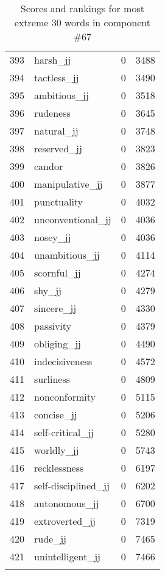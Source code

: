 \begin{longtable}[!htbp]{| rlr@{.}l |}
    393 & harsh\_jj & 0 & 3488 \\
    394 & tactless\_jj & 0 & 3490 \\
    395 & ambitious\_jj & 0 & 3518 \\
    396 & rudeness & 0 & 3645 \\
    397 & natural\_jj & 0 & 3748 \\
    398 & reserved\_jj & 0 & 3823 \\
    399 & candor & 0 & 3826 \\
    400 & manipulative\_jj & 0 & 3877 \\
    401 & punctuality & 0 & 4032 \\
    402 & unconventional\_jj & 0 & 4036 \\
    403 & nosey\_jj & 0 & 4036 \\
    404 & unambitious\_jj & 0 & 4114 \\
    405 & scornful\_jj & 0 & 4274 \\
    406 & shy\_jj & 0 & 4279 \\
    407 & sincere\_jj & 0 & 4330 \\
    408 & passivity & 0 & 4379 \\
    409 & obliging\_jj & 0 & 4490 \\
    410 & indecisiveness & 0 & 4572 \\
    411 & surliness & 0 & 4809 \\
    412 & nonconformity & 0 & 5115 \\
    413 & concise\_jj & 0 & 5206 \\
    414 & self-critical\_jj & 0 & 5280 \\
    415 & worldly\_jj & 0 & 5743 \\
    416 & recklessness & 0 & 6197 \\
    417 & self-disciplined\_jj & 0 & 6202 \\
    418 & autonomous\_jj & 0 & 6700 \\
    419 & extroverted\_jj & 0 & 7319 \\
    420 & rude\_jj & 0 & 7465 \\
    421 & unintelligent\_jj & 0 & 7466 \\
    \hline
    \caption{Scores and rankings for most extreme 30 words in component \#67} \\
\end{longtable}

